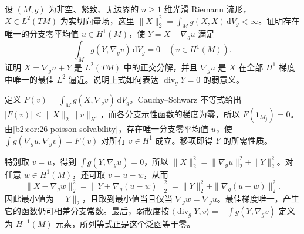 \begin{optionalexercise}
\label{b2:ex:26-gradient-projection}
设 \((M,g)\) 为非空、紧致、无边界的 \(n\geq1\) 维光滑 Riemann 流形，\(X\in L^2(TM)\) 为实切向量场，这里
\(\|X\|_2^2=\int_Mg(X,X)\,\mathrm dV_g<\infty\)。证明存在唯一的分支零平均值 \(u\in H^1(M)\)，使 \(Y=X-\nabla_gu\) 满足
\[
 \int_Mg(Y,\nabla_gv)\,\mathrm dV_g=0
 \quad(v\in H^1(M)).
\]
证明 \(X=\nabla_gu+Y\) 是 \(L^2(TM)\) 中的正交分解，并且 \(\nabla_gu\) 是 \(X\) 在全部 \(H^1\) 梯度中唯一的最佳 \(L^2\) 逼近。说明上式如何表达 \(\operatorname{div}_gY=0\) 的弱意义。
\end{optionalexercise}
\begin{solution}
定义
\(F(v)=\int_Mg(X,\nabla_gv)\,\mathrm dV_g\)。Cauchy--Schwarz 不等式给出
\(|F(v)|\leq\|X\|_2\|v\|_{H^1}\)，而各分支示性函数的梯度为零，所以 \(F(\mathbf1_{M_j})=0\)。由\cref{b2:cor:26-poisson-solvability}，存在唯一分支零平均值 \(u\)，使
\(\int g(\nabla_gu,\nabla_gv)=F(v)\) 对所有 \(v\in H^1\) 成立。移项即得 \(Y\) 的所需性质。

特别取 \(v=u\)，得到 \(\int g(Y,\nabla_gu)=0\)，所以
\(\|X\|_2^2=\|\nabla_gu\|_2^2+\|Y\|_2^2\)。对任意 \(w\in H^1(M)\)，还可取 \(v=u-w\)，从而
\[
 \|X-\nabla_gw\|_2^2
 =\|Y+\nabla_g(u-w)\|_2^2
 =\|Y\|_2^2+\|\nabla_g(u-w)\|_2^2.
\]
因此最小值为 \(\|Y\|_2\)，且取到最小值当且仅当 \(\nabla_gw=\nabla_gu\)。最佳梯度唯一，产生它的函数仍可相差分支常数。最后，弱散度按
\(\langle\operatorname{div}_gY,v\rangle=-\int g(Y,\nabla_gv)\)
定义为 \(H^{-1}(M)\) 元素，所列等式正是这个泛函等于零。
\end{solution}


